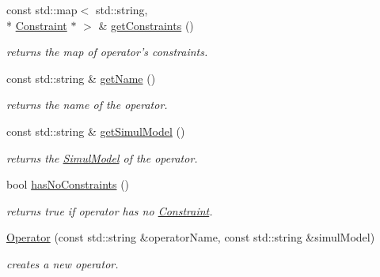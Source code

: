 \begin{DoxyCompactItemize}
\item 
\hypertarget{class_open_chams_1_1_operator_a0002889b395185948d7c71b261343620}{const std\-::map$<$ std\-::string, \\*
\hyperlink{class_open_chams_1_1_operator_1_1_constraint}{Constraint} $\ast$ $>$ \& \hyperlink{class_open_chams_1_1_operator_a0002889b395185948d7c71b261343620}{get\-Constraints} ()}\label{class_open_chams_1_1_operator_a0002889b395185948d7c71b261343620}

\begin{DoxyCompactList}\small\item\em returns the map of operator's constraints. \end{DoxyCompactList}\item 
\hypertarget{class_open_chams_1_1_operator_a2858c0c4e8b5108f041237cf5a802029}{const std\-::string \& \hyperlink{class_open_chams_1_1_operator_a2858c0c4e8b5108f041237cf5a802029}{get\-Name} ()}\label{class_open_chams_1_1_operator_a2858c0c4e8b5108f041237cf5a802029}

\begin{DoxyCompactList}\small\item\em returns the name of the operator. \end{DoxyCompactList}\item 
\hypertarget{class_open_chams_1_1_operator_aa189a1b119b44a8877c478e2d2357a89}{const std\-::string \& \hyperlink{class_open_chams_1_1_operator_aa189a1b119b44a8877c478e2d2357a89}{get\-Simul\-Model} ()}\label{class_open_chams_1_1_operator_aa189a1b119b44a8877c478e2d2357a89}

\begin{DoxyCompactList}\small\item\em returns the \hyperlink{class_open_chams_1_1_simul_model}{Simul\-Model} of the operator. \end{DoxyCompactList}\item 
\hypertarget{class_open_chams_1_1_operator_a9ac68ad3e43b1649a8582c8685f4886d}{bool \hyperlink{class_open_chams_1_1_operator_a9ac68ad3e43b1649a8582c8685f4886d}{has\-No\-Constraints} ()}\label{class_open_chams_1_1_operator_a9ac68ad3e43b1649a8582c8685f4886d}

\begin{DoxyCompactList}\small\item\em returns true if operator has no \hyperlink{class_open_chams_1_1_operator_1_1_constraint}{Constraint}. \end{DoxyCompactList}\item 
\hyperlink{class_open_chams_1_1_operator_a9e0a20318f4b2d91498f82b90504f2af}{Operator} (const std\-::string \&operator\-Name, const std\-::string \&simul\-Model)
\begin{DoxyCompactList}\small\item\em creates a new operator. \end{DoxyCompactList}\end{DoxyCompactItemize}


